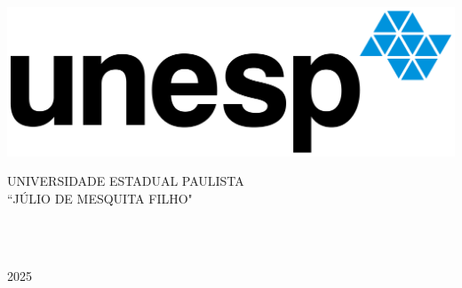 
\thispagestyle{empty}

\begin{minipage}[c]{0.3\textwidth}
\includegraphics[width=\textwidth]{images/unesp.png}
\end{minipage}
\hspace{10pt}
\begin{minipage}[c]{0.6\textwidth}
\uppercase{Universidade Estadual Paulista \\``Júlio de Mesquita Filho"}
\end{minipage}

\vspace{1.5cm}

\begin{center}
    \vspace{0.5cm}
    \julio\\
\end{center}

\vspace{5cm}

\begin{center}
    \tituloH
\end{center}

\vspace*{\fill}

\begin{center}
    \uppercase{\cidade\\2025}
\end{center}
